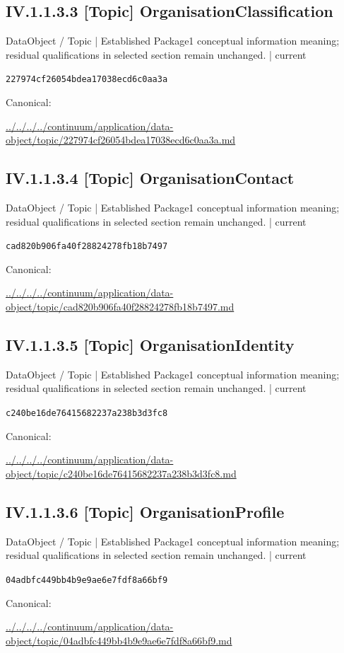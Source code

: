 \documentclass[10pt,a4paper]{article}
\begin{document}
\subsection*{IV.1.1.3.3 [Topic] OrganisationClassification}
\label{element-227974cf26054bdea17038ecd6c0aa3a}
{\small DataObject / Topic | Established Package1 conceptual information meaning; residual qualifications in selected section remain unchanged. | current}\par
\texttt{227974cf26054bdea17038ecd6c0aa3a}\par
Canonical: \par
{\footnotesize\url{../../../../continuum/application/data-object/topic/227974cf26054bdea17038ecd6c0aa3a.md}}\par
\subsection*{IV.1.1.3.4 [Topic] OrganisationContact}
\label{element-cad820b906fa40f28824278fb18b7497}
{\small DataObject / Topic | Established Package1 conceptual information meaning; residual qualifications in selected section remain unchanged. | current}\par
\texttt{cad820b906fa40f28824278fb18b7497}\par
Canonical: \par
{\footnotesize\url{../../../../continuum/application/data-object/topic/cad820b906fa40f28824278fb18b7497.md}}\par
\subsection*{IV.1.1.3.5 [Topic] OrganisationIdentity}
\label{element-c240be16de76415682237a238b3d3fc8}
{\small DataObject / Topic | Established Package1 conceptual information meaning; residual qualifications in selected section remain unchanged. | current}\par
\texttt{c240be16de76415682237a238b3d3fc8}\par
Canonical: \par
{\footnotesize\url{../../../../continuum/application/data-object/topic/c240be16de76415682237a238b3d3fc8.md}}\par
\subsection*{IV.1.1.3.6 [Topic] OrganisationProfile}
\label{element-04adbfc449bb4b9e9ae6e7fdf8a66bf9}
{\small DataObject / Topic | Established Package1 conceptual information meaning; residual qualifications in selected section remain unchanged. | current}\par
\texttt{04adbfc449bb4b9e9ae6e7fdf8a66bf9}\par
Canonical: \par
{\footnotesize\url{../../../../continuum/application/data-object/topic/04adbfc449bb4b9e9ae6e7fdf8a66bf9.md}}\par
\end{document}

